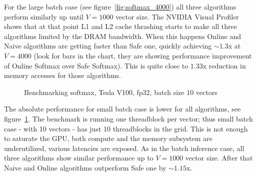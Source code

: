 \documentclass{article}
\begin{document}
For the large batch case (see figure~\ref{fig:softmax_4000}) all three algorithms perform similarly up until $V=1000$ vector size. The NVIDIA Visual Profiler shows that at that point L1 and L2 cache thrashing starts to make all three algorithms limited by the DRAM bandwidth. When this happens Online and Naive algorithms are getting faster than Safe one, quickly achieving $\sim 1.3$x at $V=4000$ (look for bars in the chart, they are showing performance improvement of Online Softmax over Safe Softmax). This is quite close to $1.33$x reduction in memory accesses for those algorithms.

\begin{figure}[ht]
\centering
{}
\caption{Benchmarking softmax, Tesla V100, fp32, batch size 10 vectors}
\label{fig:softmax_10}
\end{figure}

The absolute performance for small batch case is lower for all algorithms, see figure~\ref{fig:softmax_10}. The benchmark is running one threadblock per vector; thus small batch case - with 10 vectors - has just 10 threadblocks in the grid. This is not enough to saturate the GPU, both compute and the memory subsystem are underutilized, various latencies are exposed. As in the batch inference case, all three algorithms show similar performance up to $V=1000$ vector size. After that Naive and Online algorithms outperform Safe one by $\sim 1.15$x.
\end{document}

